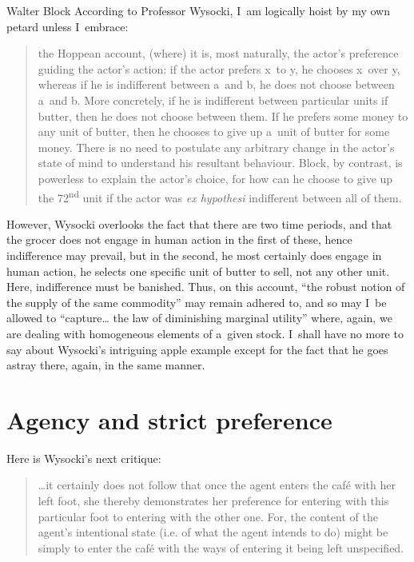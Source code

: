 \begin{artengenv}{Walter Block}
According to Professor Wysocki, I~am logically hoist by my own petard unless I~embrace:



\begin{quote}
the Hoppean account, (where) it is, most naturally, the actor's preference guiding the actor's action: if the actor prefers x~to y, he chooses x~over y, whereas if he is indifferent between a~and b, he does not choose between a~and b. More concretely, if he is indifferent between particular units if butter, then he does not choose between them. If he prefers some money to any unit of butter, then he chooses to give up a~unit of butter for some money. There is no need to postulate any arbitrary change in the actor's state of mind to understand his resultant behaviour. Block, by contrast, is powerless to explain the actor's choice, for how can he choose to give up the 72\textsuperscript{nd} unit if the actor was \textit{ex hypothesi} indifferent between all of them.
\end{quote}



However, Wysocki overlooks the fact that there are two time periods, and that the grocer does not engage in human action in the first of these, hence indifference may prevail, but in the second, he most certainly does engage in human action, he selects one specific unit of butter to sell, not any other unit. Here, indifference must be banished. Thus, on this account, ``the robust notion of the supply of the same commodity'' may remain adhered to, and so may I~be allowed to ``capture… the law of diminishing marginal utility'' where, again, we are dealing with homogeneous elements of a~given stock. I~shall have no more to say about Wysocki's intriguing apple example except for the fact that he goes astray there, again, in the same manner.



\section{Agency and strict preference}

Here is Wysocki's next critique:



\begin{quote}
…it certainly does not follow that once the agent enters the café with her left foot, she thereby demonstrates her preference for entering with this particular foot to entering with the other one. For, the content of the agent's intentional state (i.e. of what the agent intends to do) might be simply to enter the café with the ways of entering it being left unspecified.
\end{quote}




\end{artengenv}
